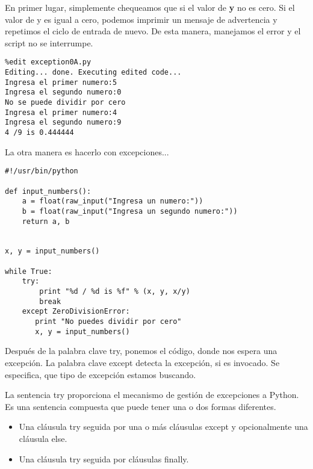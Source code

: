 \documentclass[twoside,10.5pt]{article}%
\begin{document}
\vspace{0.3cm}

En primer lugar, simplemente chequeamos que si el valor de \textbf{y } no es cero. Si el valor de y es igual a cero, podemos imprimir un mensaje de advertencia y repetimos el ciclo de entrada de nuevo. De esta manera, manejamos  el error y el script no se interrumpe.

\vspace{0.3cm}

\begin{verbatim}
%edit exception0A.py
Editing... done. Executing edited code...
Ingresa el primer numero:5
Ingresa el segundo numero:0
No se puede dividir por cero
Ingresa el primer numero:4
Ingresa el segundo numero:9
4 /9 is 0.444444
\end{verbatim}


\vspace{0.3cm}

La otra manera es hacerlo con {\color{red} excepciones...}

\vspace{0.3cm}

\begin{verbatim}
#!/usr/bin/python

def input_numbers():
    a = float(raw_input("Ingresa un numero:"))
    b = float(raw_input("Ingresa un segundo numero:"))
    return a, b


x, y = input_numbers()

while True:
    try:
        print "%d / %d is %f" % (x, y, x/y)
        break
    except ZeroDivisionError:
       print "No puedes dividir por cero"
       x, y = input_numbers() 
\end{verbatim}


\vspace{0.3cm}

Despu\'es de la palabra clave {\color{blue}try}, ponemos el c\'odigo, donde nos espera una excepci\'on. La palabra clave {\color{blue} except } detecta la excepci\'on, si es invocado. Se especifica, que tipo de excepci\'on estamos buscando.


La sentencia {\color{red} try} proporciona el mecanismo de gesti\'on de excepciones a Python. Es una sentencia compuesta que puede tener una o dos formas diferentes.

\begin{itemize}
\item Una cl\'ausula {\color{red} try} seguida por una o m\'as cl\'ausulas {\color{red} except} y opcionalmente una cl\'ausula {\color{red} else}.
\item  Una cl\'ausula {\color{red} try} seguida por cl\'ausulas {\color{red} finally}.
\end{itemize}
\end{document}

